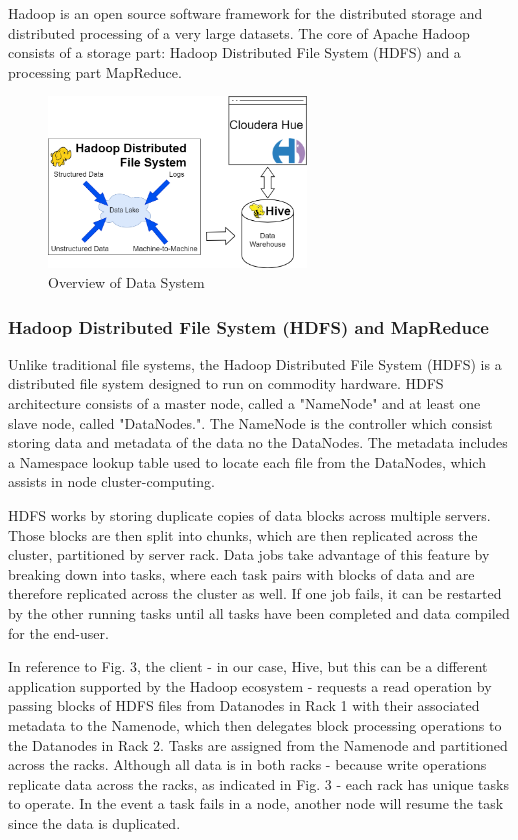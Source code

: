 \documentclass[journal]{IEEEtran}
\begin{document}
Hadoop is an open source software framework for the distributed storage and
 distributed processing of a very large datasets. 
The core of Apache Hadoop consists of a storage part: Hadoop Distributed File System
 (HDFS) and a processing part MapReduce.

\begin{figure}
	\centering
	\includegraphics[width=2.7in]{system_overview_final.png}
	\caption{Overview of Data System}
	\label{system_overview_final}
\end{figure}

\subsubsection{Hadoop Distributed File System (HDFS) and  MapReduce}

Unlike traditional file systems, the Hadoop Distributed File System (HDFS) is a distributed file system designed to run on commodity hardware. 
HDFS architecture consists of a master node, called a "NameNode" and at least one slave node, called "DataNodes."\cite{HDFSarchitecture}.
The NameNode is the controller which consist storing data and metadata of the data no the DataNodes. 
The metadata includes a Namespace lookup table used to locate each file from the DataNodes, which assists in node cluster-computing. 

HDFS works by storing duplicate copies of data blocks across multiple servers. Those blocks are then split into chunks, which are then 
replicated across the cluster, partitioned by server rack. Data jobs take advantage of this feature by breaking down into tasks, 
where each task pairs with blocks of data and are therefore replicated across the cluster as well. If one job fails, it can be restarted 
by the other running tasks until all tasks have been completed and data compiled for the end-user. \cite{HadoopAdmin}

In reference to Fig. 3, the client - in our case, Hive, but this can be a different application supported by the Hadoop ecosystem - requests a 
read operation by passing blocks of HDFS files from Datanodes in Rack 1 with their associated metadata to the Namenode, which then delegates
block processing operations to the Datanodes in Rack 2. Tasks are assigned from the Namenode and partitioned across the racks. 
Although all data is in both racks - because write operations replicate data across the racks, as indicated in Fig. 3 - each rack has unique tasks
to operate. In the event a task fails in a node, another node will resume the task since the data is duplicated. \cite{HadoopAdmin}
\end{document}
